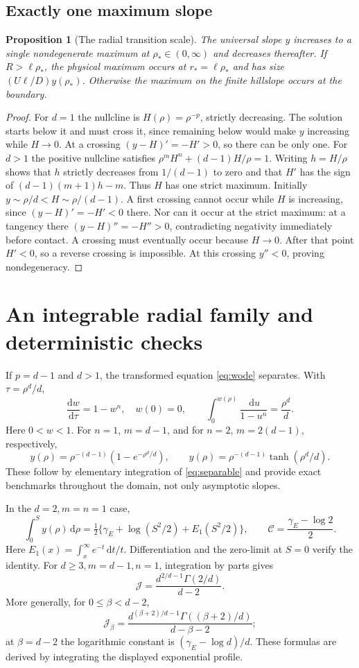 \documentclass[11pt,a4paper]{article}
\newtheorem{proposition}[theorem]{Proposition}
\theoremstyle{definition}\newtheorem{definition}[theorem]{Definition}
\theoremstyle{remark}\newtheorem{remark}[theorem]{Remark}
\newcommand{\dd}{\,\mathrm d}
\begin{document}
\subsection{Exactly one maximum slope}
\begin{proposition}[The radial transition scale]\label{prop:peak}
The universal slope $y$ increases to a single nondegenerate maximum at $\rho_*\in(0,\infty)$ and decreases thereafter. If $R>\ell\rho_*$, the physical maximum occurs at $r_* =\ell\rho_*$ and has size $(U\ell/D)y(\rho_*)$. Otherwise the maximum on the finite hillslope occurs at the boundary.
\end{proposition}
\begin{proof}
For $d=1$ the nullcline is $H(\rho)=\rho^{-p}$, strictly decreasing. The solution starts below it and must cross it, since remaining below would make $y$ increasing while $H\to0$. At a crossing $(y-H)'=-H'>0$, so there can be only one.
For $d>1$ the positive nullcline satisfies
$\rho^m H^n+(d-1)H/\rho=1$.
Writing $h=H/\rho$ shows that $h$ strictly decreases from $1/(d-1)$ to zero and that $H'$ has the sign of $(d-1)(m+1)h-m$. Thus $H$ has one strict maximum. Initially $y\sim\rho/d<H\sim\rho/(d-1)$. A first crossing cannot occur while $H$ is increasing, since $(y-H)'=-H'<0$ there. Nor can it occur at the strict maximum: at a tangency there $(y-H)''=-H''>0$, contradicting negativity immediately before contact. A crossing must eventually occur because $H\to0$. After that point $H'<0$, so a reverse crossing is impossible. At this crossing $y''<0$, proving nondegeneracy.
\end{proof}

\section{An integrable radial family and deterministic checks}
If $p=d-1$ and $d>1$, the transformed equation \eqref{eq:wode} separates. With $\tau=\rho^d/d$,
\begin{equation}
 \frac{\mathrm dw}{\mathrm d\tau}=1-w^n,\quad w(0)=0,
 \qquad\int_0^{w(\rho)}\frac{\dd u}{1-u^n}=\frac{\rho^d}{d}.\label{eq:separable}
\end{equation}
Here $0<w<1$. For $n=1$, $m=d-1$, and for $n=2$, $m=2(d-1)$, respectively,
\[
 y(\rho)=\rho^{-(d-1)}(1-e^{-\rho^d/d}),\qquad
 y(\rho)=\rho^{-(d-1)}\tanh(\rho^d/d).
\]
These follow by elementary integration of \eqref{eq:separable} and provide exact benchmarks throughout the domain, not only asymptotic slopes.

In the $d=2,m=n=1$ case,
\begin{equation}
 \int_0^S y(\rho)\dd\rho
 =\tfrac12\{\gamma_E+\log(S^2/2)+E_1(S^2/2)\},\qquad
 \mathcal C=\frac{\gamma_E-\log2}{2}.\label{eq:exactlog}
\end{equation}
Here $E_1(x)=\int_x^\infty e^{-t}\dd t/t$. Differentiation and the zero-limit at $S=0$ verify the identity. For $d\geq3,m=d-1,n=1$, integration by parts gives
\[
 \mathcal J=\frac{d^{2/d-1}\Gamma(2/d)}{d-2}.
\]
More generally, for $0\leq\beta<d-2$,
\[
 \mathcal J_\beta=
 \frac{d^{(\beta+2)/d-1}\Gamma((\beta+2)/d)}{d-\beta-2};
\]
at $\beta=d-2$ the logarithmic constant is $(\gamma_E-\log d)/d$. These formulas are derived by integrating the displayed exponential profile.
\end{document}
